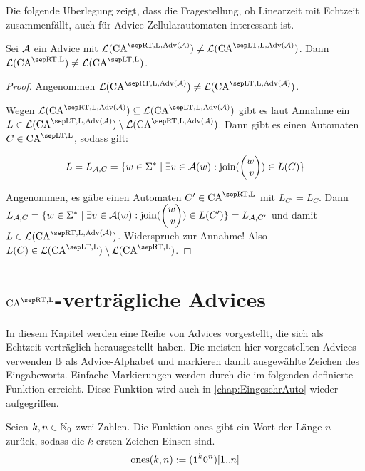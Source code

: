 Die folgende Überlegung zeigt, dass die Fragestellung, ob Linearzeit mit Echtzeit zusammenfällt,
auch für Advice-Zellularautomaten interessant ist.
\begin{satz}
    Sei $\mathcal{A}$ ein Advice mit $\CAL{\CART, \CALeft, \orakel({\advA})} \neq \CAL{\CALT, \CALeft, \orakel({\advA})}$.
    Dann $\CAL{\CART, \CALeft} \neq \CAL{\CALT, \CALeft}$.
\end{satz}
\begin{proof}
    Angenommen $\CAL{\CART, \CALeft, \orakel({\advA})} \neq \CAL{\CALT, \CALeft, \orakel({\advA})}$.
    
    Wegen $\CAL{\CART, \CALeft, \orakel({\advA})} \subseteq \CAL{\CALT, \CALeft, \orakel({\advA})}$
    gibt es laut Annahme ein $L \in \CAL{\CALT, \CALeft, \orakel({\advA})} \setminus \CAL{\CART, \CALeft, \orakel({\advA})}$.
    Dann gibt es einen Automaten $C \in \CAM{\CALT, \CALeft}$, sodass gilt:
    
    \[
        L = L_{\advA, C} = \set{ w \in \Sigma^*}{\exists v \in \advA(w): \joinw(\Spvek{w; v}) \in L(C)}
    \]
    
    Angenommen, es gäbe einen Automaten $C' \in \CAM{\CART, \CALeft}$ mit $L_{C'} = L_C$.
    Dann $L_{\advA, C} = \set{ w \in \Sigma^*}{\exists v \in \advA(w): \joinw(\Spvek{w; v}) \in L(C')} = L_{\advA, C'}$ und damit
    $L \in \CAL{\CART, \CALeft, \orakel({\advA})}$.
    Widerspruch zur Annahme! Also $L(C) \in \CAL{\CALT, \CALeft} \setminus \CAL{\CART, \CALeft}$.
\end{proof}


\section{\texorpdfstring{$\CAM{\CART, \CALeft}$}{CA\^RT-L}-verträgliche Advices}

In diesem Kapitel werden eine Reihe von Advices vorgestellt, die sich als Echtzeit-verträglich herausgestellt haben.
Die meisten hier vorgestellten Advices verwenden $\mathbb{B}$ als Advice-Alphabet
und markieren damit ausgewählte Zeichen des Eingabeworts.
Einfache Markierungen werden durch die im folgenden definierte Funktion erreicht.
Diese Funktion wird auch in \cref{chap:EingeschrAuto} wieder aufgegriffen.

\begin{definition}
    Seien $k, n \in \mathbb{N}_0$ zwei Zahlen. Die Funktion $\mathrm{ones}$ gibt ein Wort der Länge $n$ zurück, sodass die $k$ ersten Zeichen Einsen sind.
    \[
        \mathrm{ones}(k, n) := (\texttt{1}^k \texttt{0}^n)[1..n]
    \]
\end{definition}


